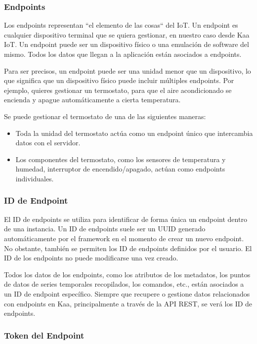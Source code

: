 {\subsubsection{Endpoints}

Los endpoints representan ``el elemento de las cosas`` del IoT. Un endpoint es cualquier dispositivo terminal que se quiera gestionar, en nuestro caso desde Kaa IoT. Un endpoint puede ser un dispositivo físico o una emulación de software del mismo. Todos los datos que llegan a la aplicación están asociados a endpoints. \cite{kaaiotConcepts}

Para ser precisos, un endpoint puede ser una unidad menor que un dispositivo, lo que significa que un dispositivo físico puede incluir múltiples endpoints. Por ejemplo, quieres gestionar un termostato, para que el aire acondicionado se encienda y apague automáticamente a cierta temperatura.

Se puede gestionar el termostato de una de las siguientes maneras:

\begin{itemize}
    \item Toda la unidad del termostato actúa como un endpoint único que intercambia datos con el servidor.
    \item Los componentes del termostato, como los sensores de temperatura y humedad, interruptor de encendido/apagado, actúan como endpoints individuales.
\end{itemize}

\subsubsection{ID de Endpoint}

El ID de endpoints se utiliza para identificar de forma única un endpoint dentro de una instancia. Un ID de endpoints suele ser un UUID generado automáticamente por el framework en el momento de crear un nuevo endpoint. No obstante, también se permiten los ID de endpoints definidos por el usuario. El ID de los endpoints no puede modificarse una vez creado.

Todos los datos de los endpoints, como los atributos de los metadatos, los puntos de datos de series temporales recopilados, los comandos, etc., están asociados a un ID de endpoint específico. Siempre que recupere o gestione datos relacionados con endpoints en Kaa, principalmente a través de la API REST, se verá los ID de endpoints.

\subsubsection{Token del Endpoint} \label{llamada-mqtt}

}
